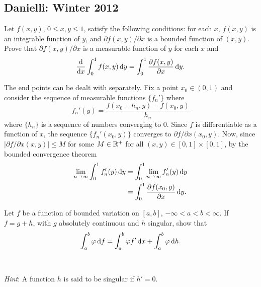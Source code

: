 \subsection{Danielli: Winter 2012}
\setcounter{exercise}{0}
\setcounter{equation}{0}

\begin{problem}
  Let \(f(x,y)\), \(0\leq x,y\leq 1\), satisfy the following conditions:
  for each \(x\), \(f(x,y)\) is an integrable function of \(y\), and
  \(\partial f(x,y)/\partial x\) is a bounded function of \((x,y)\). Prove
  that \(\partial f(x,y)/\partial x\) is a measurable function of \(y\) for
  each \(x\) and
  \[
    \frac{\mathrm{d}}{\mathrm{d} x}\int_0^1f(x,y)\mathop{}\!\mathrm{d} y= \int_0^1\frac{\partial
      f(x,y)}{\partial x}\mathop{}\!\mathrm{d} y.
  \]
\end{problem}
\begin{solution}
  The end points can be dealt with separately. Fix a point \(x_0\in(0,1)\)
  and consider the sequence of measurable functions \(\{f_n'\}\) where
  \[
    f_n'(y)=\frac{f(x_0+h_n,y)-f(x_0,y)}{h_n}
  \]
  where \(\{h_n\}\) is a sequence of numbers converging to \(0\). Since
  \(f\) is differentiable as a function of \(x\), the sequence
  \(\{f_n'(x_0,y)\}\) converges to \(\partial f/\partial x(x_0,y)\). Now,
  since \(|\partial f/\partial x(x,y)|\leq M\) for some \(M\in\mathbb{R}^+\) for
  all \((x,y)\in[0,1]\times[0,1]\), by the bounded convergence theorem
  \begin{align*}
    \lim_{n\to\infty}\int_0^1 f'_n(y)\mathop{}\!\mathrm{d} y
    &=\int_0^1\lim_{n\to\infty} f'_n(y)\mathop{}\!\mathrm{d} y\\
    &=\int_0^1 \frac{\partial f(x_0,y)}{\partial x}\mathop{}\!\mathrm{d} y.
  \end{align*}
\end{solution}

\begin{problem}
  Let \(f\) be a function of bounded variation on \([a,b]\),
  \(-\infty<a<b<\infty\). If \(f=g+h\), with \(g\) absolutely continuous
  and \(h\) singular, show that
  \[
    \int_a^b\varphi\mathop{}\!\mathrm{d} f=\int_a^b\varphi f'\mathop{}\!\mathrm{d} x+\int_a^b\varphi\mathop{}\!\mathrm{d}
    h.
  \]
  \\\\
  \emph{Hint}: A function \(h\) is said to be singular if \(h'=0\).
\end{problem}
\begin{solution}
\end{solution}

